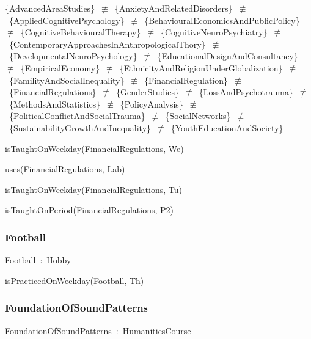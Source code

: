 \documentclass{article}
\begin{document}
\{AdvancedAreaStudies\}~\ensuremath{\not\equiv}~\{AnxietyAndRelatedDisorders\}~\ensuremath{\not\equiv}~\{AppliedCognitivePsychology\}~\ensuremath{\not\equiv}~\{BehaviouralEconomicsAndPublicPolicy\}~\ensuremath{\not\equiv}~\{CognitiveBehaviouralTherapy\}~\ensuremath{\not\equiv}~\{CognitiveNeuroPsychiatry\}~\ensuremath{\not\equiv}~\{ContemporaryApproachesInAnthropologicalThory\}~\ensuremath{\not\equiv}~\{DevelopmentalNeuroPsychology\}~\ensuremath{\not\equiv}~\{EducationalDesignAndConsultancy\}~\ensuremath{\not\equiv}~\{EmpiricalEconomy\}~\ensuremath{\not\equiv}~\{EthnicityAndReligionUnderGlobalization\}~\ensuremath{\not\equiv}~\{FamilityAndSocialInequality\}~\ensuremath{\not\equiv}~\{FinancialRegulation\}~\ensuremath{\not\equiv}~\{FinancialRegulations\}~\ensuremath{\not\equiv}~\{GenderStudies\}~\ensuremath{\not\equiv}~\{LossAndPsychotrauma\}~\ensuremath{\not\equiv}~\{MethodsAndStatistics\}~\ensuremath{\not\equiv}~\{PolicyAnalysis\}~\ensuremath{\not\equiv}~\{PoliticalConflictAndSocialTrauma\}~\ensuremath{\not\equiv}~\{SocialNetworks\}~\ensuremath{\not\equiv}~\{SustainabilityGrowthAndInequality\}~\ensuremath{\not\equiv}~\{YouthEducationAndSociety\}

isTaughtOnWeekday(FinancialRegulations, We)

uses(FinancialRegulations, Lab)

isTaughtOnWeekday(FinancialRegulations, Tu)

isTaughtOnPeriod(FinancialRegulations, P2)

\subsubsection*{Football}

Football~:~Hobby

isPracticedOnWeekday(Football, Th)

\subsubsection*{FoundationOfSoundPatterns}

FoundationOfSoundPatterns~:~HumanitiesCourse
\end{document}
